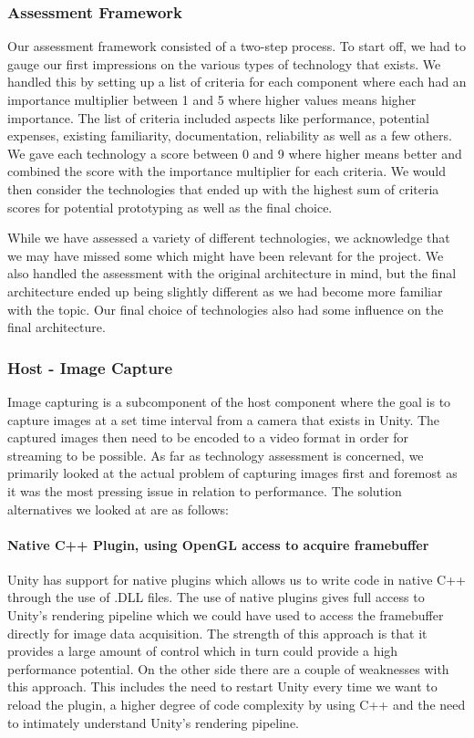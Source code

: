 \subsubsection{Assessment Framework}
Our assessment framework consisted of a two-step process. To start off, we had to gauge our first impressions on the various types of technology that exists. We handled this by setting up a list of criteria for each component where each had an importance multiplier between 1 and 5 where higher values means higher importance. The list of criteria included aspects like performance, potential expenses, existing familiarity, documentation, reliability as well as a few others. We gave each technology a score between 0 and 9 where higher means better and combined the score with the importance multiplier for each criteria. We would then consider the technologies that ended up with the highest sum of criteria scores for potential prototyping as well as the final choice. 

While we have assessed a variety of different technologies, we acknowledge that we may have missed some which might have been relevant for the project. We also handled the assessment with the original architecture in mind, but the final architecture ended up being slightly different as we had become more familiar with the topic. Our final choice of technologies also had some influence on the final architecture. 

\subsubsection{Host - Image Capture} %
Image capturing is a subcomponent of the host component where the goal is to capture images at a set time interval from a camera that exists in Unity. The captured images then need to be encoded to a video format in order for streaming to be possible. As far as technology assessment is concerned, we primarily looked at the actual problem of capturing images first and foremost as it was the most pressing issue in relation to performance. The solution alternatives we looked at are as follows:

\paragraph{Native C++ Plugin, using OpenGL access to acquire framebuffer}
Unity has support for native plugins\cite{unity_native_plugin} which allows us to write code in native C++ through the use of .DLL files. The use of native plugins gives full access to Unity's rendering pipeline which we could have used to access the framebuffer directly for image data acquisition. The strength of this approach is that it provides a large amount of control which in turn could provide a high performance potential. On the other side there are a couple of weaknesses with this approach. This includes the need to restart Unity every time we want to reload the plugin, a higher degree of code complexity by using C++ and the need to intimately understand Unity's rendering pipeline.  

